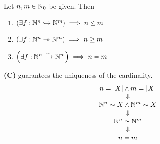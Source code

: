 \bigskip

\begin{lemma} \label{an:lem:properties-of-Nm-Nn}
    Let $n, m \in \N_{0}$ be given. Then
    \begin{enumerate}[label=\textbf{(\Alph*)}]
        \item $\paren*{\exists f: \N^{n} \hookrightarrow \N^{m}} \implies n \leq m$
        \item $\paren*{\exists f: \N^{n} \twoheadrightarrow \N^{m}} \implies n \geq m$
        \item $\paren*{\exists f: \N^{n} \xrightarrow{\sim} \N^{m}} \implies n = m$
    \end{enumerate}
    \textbf{(C)} guarantees the uniqueness of the cardinality.
    \[
    \begin{array}{c}
        n = \abs*{X} \land m = \abs*{X} \\
        \Downarrow \\
        \N^{n} \sim X \land \N^{m} \sim X \\
        \Downarrow \\
        \N^{n} \sim \N^{m} \\
        \Downarrow \\
        n = m
    \end{array}
    \]
\end{lemma}

